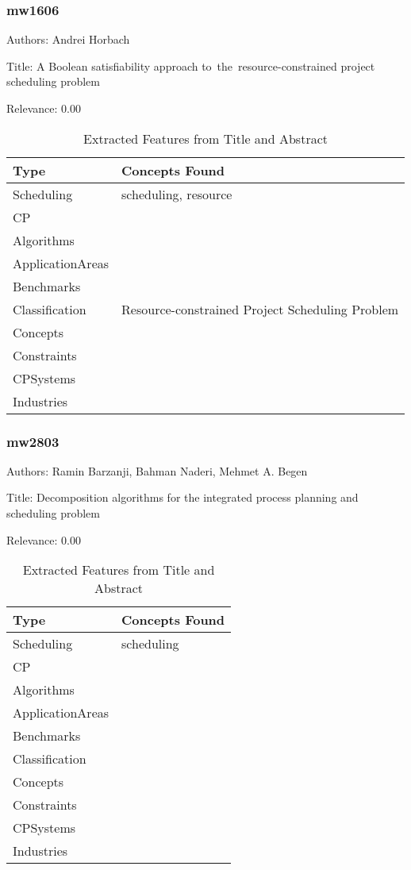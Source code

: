 \subsubsection{mw1606}
\label{mw:mw1606}

Authors: Andrei Horbach

Title: A Boolean satisfiability approach to the resource-constrained project scheduling problem

Relevance:  0.00

{\scriptsize
\begin{longtable}{p{2cm}p{20cm}}
\caption{Extracted Features from Title and Abstract}\\ \toprule
Type & Concepts Found\\ \midrule
\endhead
\bottomrule
\endfoot
Scheduling & scheduling, resource\\ 
CP & \\ 
Algorithms & \\ 
ApplicationAreas & \\ 
Benchmarks & \\ 
Classification & Resource-constrained Project Scheduling Problem\\ 
Concepts & \\ 
Constraints & \\ 
CPSystems & \\ 
Industries & \\ 
\end{longtable}
}



\subsubsection{mw2803}
\label{mw:mw2803}

Authors: Ramin Barzanji, Bahman Naderi, Mehmet A. Begen

Title: Decomposition algorithms for the integrated process planning and scheduling problem

Relevance:  0.00

{\scriptsize
\begin{longtable}{p{2cm}p{20cm}}
\caption{Extracted Features from Title and Abstract}\\ \toprule
Type & Concepts Found\\ \midrule
\endhead
\bottomrule
\endfoot
Scheduling & scheduling\\ 
CP & \\ 
Algorithms & \\ 
ApplicationAreas & \\ 
Benchmarks & \\ 
Classification & \\ 
Concepts & \\ 
Constraints & \\ 
CPSystems & \\ 
Industries & \\ 
\end{longtable}
}



